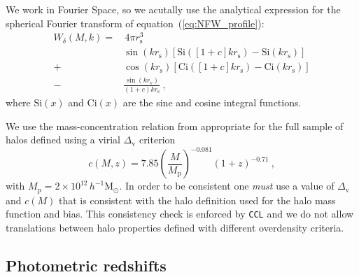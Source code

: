 \documentclass[\docopts]{\docclass}
\newcommand{\ccl}{{\tt CCL}\xspace}
\begin{document}
We work in Fourier Space, so we acutally use the analytical expression for the spherical Fourier transform of equation~(\ref{eq:NFW_profile}):
\begin{equation}
\begin{split}
W_\delta(M,k) = &\, 4\pi r_\mathrm{s}^3 \\%
& \sin(kr_\mathrm{s})\left[\mathrm{Si}([1+c]kr_\mathrm{s})-\mathrm{Si}(kr_\mathrm{s})\right] \\
+ & \cos(kr_\mathrm{s})\left[\mathrm{Ci}([1+c]kr_\mathrm{s})-\mathrm{Ci}(kr_\mathrm{s})\right] \\
- & \frac{\sin(kr_\mathrm{v})}{(1+c)kr_\mathrm{s}}\ ,%
\label{eq:NFW_Fourier}
\end{split}
\end{equation}
where $\mathrm{Si}(x)$ and $\mathrm{Ci}(x)$ are the sine and cosine integral functions.

We use the mass-concentration relation from \cite{Duffy2008} appropriate for the full sample of halos defined using a virial $\Delta_\mathrm{v}$ criterion
\begin{equation}
c(M,z)=7.85\left(\frac{M}{M_\mathrm{p}}\right)^{-0.081}(1+z)^{-0.71}\ ,
\end{equation}
with $M_\mathrm{p}=2\times10^{12}\,h^{-1}\mathrm{M}_\odot$.
In order to be consistent one \emph{must} use a value of $\Delta_\mathrm{v}$ and $c(M)$ that is consistent with the halo definition used for the halo mass function and bias. This consistency check is enforced by \ccl and we do not allow translations between halo properties defined with different overdensity criteria.

\subsection{Photometric redshifts}
\end{document}

